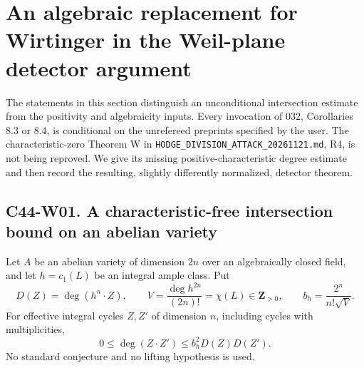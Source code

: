 
\section{An algebraic replacement for Wirtinger in the Weil-plane detector argument}

The statements in this section distinguish an unconditional intersection
estimate from the positivity and algebraicity inputs.  Every invocation of
032, Corollaries 8.3 or 8.4, is conditional on the unrefereed preprints
specified by the user.  The characteristic-zero Theorem W in
\texttt{HODGE\_DIVISION\_ATTACK\_20261121.md}, R4, is not being reproved.
We give its missing positive-characteristic degree estimate and then record
the resulting, slightly differently normalized, detector theorem.

\subsection*{C44-W01. A characteristic-free intersection bound on an abelian variety}

\begin{proposition}[C44-W01]
Let $A$ be an abelian variety of dimension $2n$ over an algebraically
closed field, and let $h=c_1(L)$ be an integral ample class.  Put
\[
 D(Z)=\deg(h^n\cdot Z),\qquad
 V=\frac{\deg h^{2n}}{(2n)!}=\chi(L)\in\mathbf Z_{>0},\qquad
 b_h=\frac{2^n}{n!\sqrt V}.
\]
For effective integral cycles $Z,Z'$ of dimension $n$, including cycles
with multiplicities,
\begin{equation}\label{c44:algebraic-bezout}
 0\leq\deg(Z\cdot Z')\leq b_h^2D(Z)D(Z').
\end{equation}
No standard conjecture and no lifting hypothesis is used.
\end{proposition}

